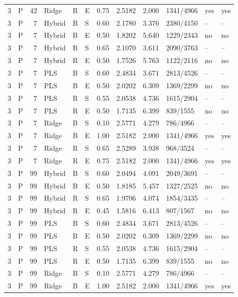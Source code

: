 \documentclass[10pt,a4paper]{article}
\begin{document}
\begin{longtable}{rlrlllrrrlll}
3 & P & 42 & Ridge & R & E & 0.75 & 2.5182 & 2.000 & 1341/4966 & yes & yes \\
3 & P & 7 & Hybrid & B & S & 0.60 & 2.1780 & 3.376 & 2380/4150 & -- & -- \\
3 & P & 7 & Hybrid & B & E & 0.50 & 1.8202 & 5.640 & 1229/2343 & no & no \\
3 & P & 7 & Hybrid & R & S & 0.65 & 2.1070 & 3.611 & 2090/3763 & -- & -- \\
3 & P & 7 & Hybrid & R & E & 0.50 & 1.7526 & 5.763 & 1122/2116 & no & no \\
3 & P & 7 & PLS & B & S & 0.60 & 2.4834 & 3.671 & 2813/4526 & -- & -- \\
3 & P & 7 & PLS & B & E & 0.50 & 2.0202 & 6.309 & 1369/2299 & no & no \\
3 & P & 7 & PLS & R & S & 0.55 & 2.0538 & 4.736 & 1615/2904 & -- & -- \\
3 & P & 7 & PLS & R & E & 0.50 & 1.7135 & 6.399 & 839/1555 & no & no \\
3 & P & 7 & Ridge & B & S & 0.10 & 2.5771 & 4.279 & 786/4966 & -- & -- \\
3 & P & 7 & Ridge & B & E & 1.00 & 2.5182 & 2.000 & 1341/4966 & yes & yes \\
3 & P & 7 & Ridge & R & S & 0.65 & 2.5289 & 3.938 & 968/3524 & -- & -- \\
3 & P & 7 & Ridge & R & E & 0.75 & 2.5182 & 2.000 & 1341/4966 & yes & yes \\
3 & P & 99 & Hybrid & B & S & 0.60 & 2.0494 & 4.091 & 2049/3691 & -- & -- \\
3 & P & 99 & Hybrid & B & E & 0.50 & 1.8185 & 5.457 & 1327/2525 & no & no \\
3 & P & 99 & Hybrid & R & S & 0.65 & 1.9706 & 4.074 & 1854/3435 & -- & -- \\
3 & P & 99 & Hybrid & R & E & 0.45 & 1.5816 & 6.413 & 807/1567 & no & no \\
3 & P & 99 & PLS & B & S & 0.60 & 2.4834 & 3.671 & 2813/4526 & -- & -- \\
3 & P & 99 & PLS & B & E & 0.50 & 2.0202 & 6.309 & 1369/2299 & no & no \\
3 & P & 99 & PLS & R & S & 0.55 & 2.0538 & 4.736 & 1615/2904 & -- & -- \\
3 & P & 99 & PLS & R & E & 0.50 & 1.7135 & 6.399 & 839/1555 & no & no \\
3 & P & 99 & Ridge & B & S & 0.10 & 2.5771 & 4.279 & 786/4966 & -- & -- \\
3 & P & 99 & Ridge & B & E & 1.00 & 2.5182 & 2.000 & 1341/4966 & yes & yes \\

\end{longtable}
\end{document}
